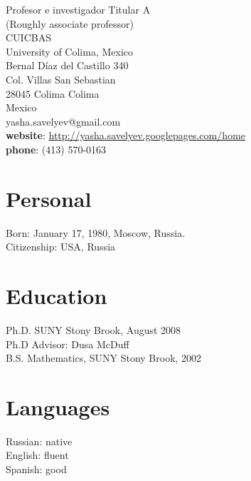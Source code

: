 \documentclass[overlapped,line,letterpaper]{res}
\begin{document}

\setlength{\leftmargini}{0em}
\renewcommand{\labelitemi}{}

\renewcommand{\namefont}{\large\textbf}
 

\begin{resume}
\begin{ncolumn}{2}
Profesor e investigador Titular A \\
(Roughly associate professor) \\
CUICBAS \\
University of Colima, Mexico \\
Bernal Díaz del Castillo 340 \\
Col. Villas San Sebastian \\
28045 Colima Colima \\
Mexico \\

yasha.savelyev@gmail.com \\
\textbf{website}: \href{https://sites.google.com/site/yashasavelyev/home} 
{http://yasha.savelyev.googlepages.com/home}\\ \textbf {phone}:
(413) 570-0163\\
\end{ncolumn}
  
 \section {\sc Personal}
  Born: January 17, 1980, Moscow, Russia. \\
 {Citizenship: USA, Russia}
\section{\sc Education}
Ph.D. SUNY Stony Brook, August 2008  \\
Ph.D Advisor: Dusa McDuff\\
B.S. Mathematics, SUNY Stony Brook, 2002\\ 
\section {\sc Languages}
   Russian: native \\
English: fluent \\
Spanish: good  \\

\end{resume}
\end{document}
